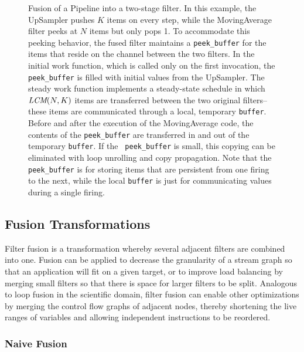 \begin{figure}
\centering
{}
\vspace{-6pt}
\caption{\protect\small Fusion of a Pipeline into a two-stage filter.
In this example, the UpSampler pushes $K$ items on every step, while the
MovingAverage filter peeks at $N$ items but only pops 1.  To accommodate
this peeking behavior, the fused filter maintains a {\tt peek\_buffer}
for the items that reside on the channel between the two filters.  In
the initial work function, which is called only on the first
invocation, the {\tt peek\_buffer} is filled with initial values from
the UpSampler.  The steady work function implements a steady-state
schedule in which $\mbox{\it LCM}(N, K)$ items are transferred between the two
original filters--these items are communicated through a local,
temporary {\tt buffer}.  Before and after the execution of the
MovingAverage code, the contents of the {\tt peek\_buffer} are
transferred in and out of the temporary {\tt buffer}.  If the {\tt
peek\_buffer} is small, this copying can be eliminated with loop
unrolling and copy propagation.  Note that the {\tt peek\_buffer} is
for storing items that are persistent from one firing to the next,
while the local {\tt buffer} is just for communicating values during a
single firing. \label{fig:fuse-pipe}}
\vspace{-6pt}
\end{figure}

\subsection{Fusion Transformations}

Filter fusion is a transformation whereby several adjacent filters are
combined into one.  Fusion can be applied to decrease the granularity
of a stream graph so that an application will fit on a given target,
or to improve load balancing by merging small filters so that there is
space for larger filters to be split.  Analogous to loop fusion in the
scientific domain, filter fusion can enable other optimizations by
merging the control flow graphs of adjacent nodes, thereby shortening
the live ranges of variables and allowing independent instructions to
be reordered.

\subsubsection{Naive Fusion}

